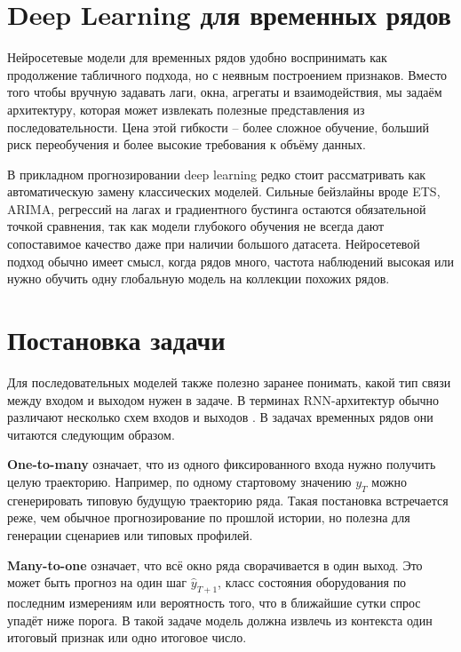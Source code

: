 \documentclass[12pt,fleqn]{article}
\newcounter{chapter}
\begin{document}
\setcounter{figure}{0}

\section{Deep Learning для временных рядов}

Нейросетевые модели для временных рядов удобно воспринимать как продолжение табличного подхода, но с неявным построением признаков.
Вместо того чтобы вручную задавать лаги, окна, агрегаты и взаимодействия, мы задаём архитектуру, которая может извлекать полезные представления из последовательности.
Цена этой гибкости -- более сложное обучение, больший риск переобучения и более высокие требования к объёму данных.

В прикладном прогнозировании deep learning редко стоит рассматривать как автоматическую замену классических моделей.
Сильные бейзлайны вроде ETS, ARIMA, регрессий на лагах и градиентного бустинга остаются обязательной точкой сравнения, так как модели глубокого обучения не всегда дают сопоставимое качество даже при наличии большого датасета.
Нейросетевой подход обычно имеет смысл, когда рядов много, частота наблюдений высокая или нужно обучить одну глобальную модель на коллекции похожих рядов.

\section{Постановка задачи}

Для последовательных моделей также полезно заранее понимать, какой тип связи между входом и выходом нужен в задаче.
В терминах RNN-архитектур обычно различают несколько схем входов и выходов \cite{arora2024}.
В задачах временных рядов они читаются следующим образом.

\textbf{One-to-many} означает, что из одного фиксированного входа нужно получить целую траекторию.
Например, по одному стартовому значению $y_T$ можно сгенерировать типовую будущую траекторию ряда.
Такая постановка встречается реже, чем обычное прогнозирование по прошлой истории, но полезна для генерации сценариев или типовых профилей.

\textbf{Many-to-one} означает, что всё окно ряда сворачивается в один выход.
Это может быть прогноз на один шаг $\hat{y}_{T+1}$, класс состояния оборудования по последним измерениям или вероятность того, что в ближайшие сутки спрос упадёт ниже порога.
В такой задаче модель должна извлечь из контекста один итоговый признак или одно итоговое число.
\end{document}
